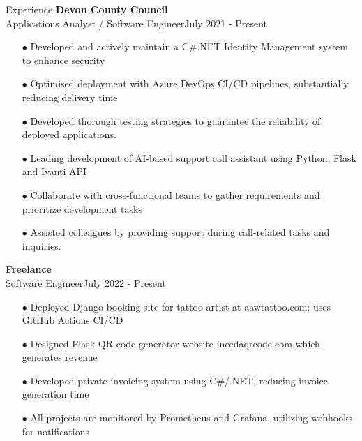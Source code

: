 \begin{rSection}{Experience}
{\bf Devon County Council} \\ 
{Applications Analyst / Software Engineer}\hfill {July 2021 - Present}
\begin{itemize}[label=\myfancylabel, leftmargin=0.5cm]
\setlength\itemsep{-0.25cm}
    \item[$\bullet$] Developed and actively maintain a C\#.NET Identity Management system to enhance security
    \item[$\bullet$] Optimised deployment with Azure DevOps CI/CD pipelines, substantially reducing delivery time
    \item[$\bullet$] Developed thorough testing strategies to guarantee the reliability of deployed applications.
    \item[$\bullet$] Leading development of AI-based support call assistant using Python, Flask and Ivanti API
    \item[$\bullet$] Collaborate with cross-functional teams to gather requirements and prioritize development tasks
    \item[$\bullet$] Assisted colleagues by providing support during call-related tasks and inquiries.
\end{itemize}
{\bf Freelance} \\ 
{Software Engineer}\hfill {July 2022 - Present}
\begin{itemize}[label=\myfancylabel, leftmargin=0.5cm]
\setlength\itemsep{-0.25cm}
    \item[$\bullet$] Deployed Django booking site for tattoo artist at aawtattoo.com; uses GitHub Actions CI/CD
    \item[$\bullet$] Designed Flask QR code generator website ineedaqrcode.com which generates revenue
    \item[$\bullet$] Developed private invoicing system using C\#/.NET, reducing invoice generation time
    \item[$\bullet$] All projects are monitored by Prometheus and Grafana, utilizing webhooks for notifications
\end{itemize}
\end{rSection}